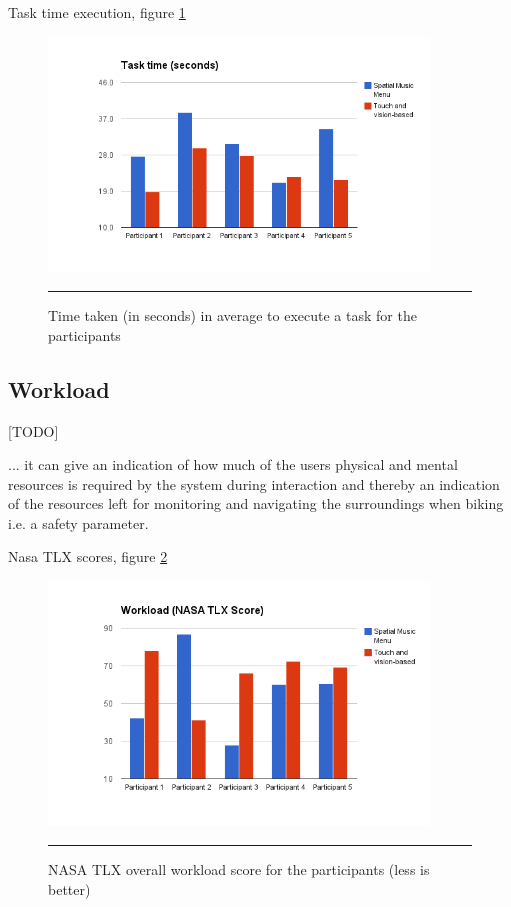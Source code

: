 Task time execution, figure \ref{fig:resultstasktime}

\begin{figure}[t]
	\centering
		\includegraphics[width=0.9\textwidth,height=\textheight,keepaspectratio]{./Figures/results_task_time.png}
		\rule{35em}{1pt}
	\caption[Results task time]{Time taken (in seconds) in average to execute a task for the participants}
	\label{fig:resultstasktime}
\end{figure}

\subsection{Workload}
[TODO]

... it can give an indication of how much of the users physical and mental resources is required by the system during interaction and thereby an indication of the resources left for monitoring and navigating the surroundings when biking i.e. a safety parameter.

Nasa TLX scores, figure \ref{fig:resultsnasatlx}

\begin{figure}[t]
	\centering
		\includegraphics[width=0.9\textwidth,height=\textheight,keepaspectratio]{./Figures/results_nasatlx.png}
		\rule{35em}{1pt}
	\caption[Results NASA TLX Score]{NASA TLX overall workload score for the participants (less is better)}
	\label{fig:resultsnasatlx}
\end{figure}

